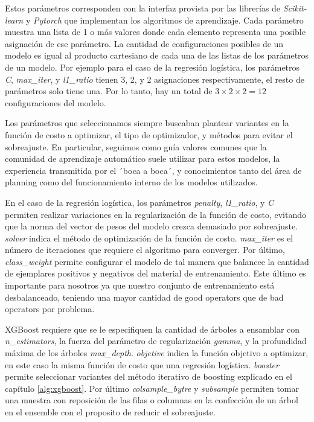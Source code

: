 Estos parámetros corresponden con la interfaz provista por las librerías de
\emph{Scikit-learn} y \emph{Pytorch} que implementan los algoritmos de aprendizaje. Cada parámetro muestra una lista de 1 o más valores donde cada elemento representa una posible asignación de ese parámetro. La cantidad de configuraciones posibles de un modelo es igual al producto cartesiano de cada una de las listas de los parámetros de un modelo. Por ejemplo para el caso de la regresión
logística, los parámetros \emph{C}, \emph{max\_iter}, y \emph{l1\_ratio} tienen 3, 2, y 2 asignaciones respectivamente, el resto de parámetros solo tiene una. Por lo tanto, hay un total de $3 \times 2 \times 2 = 12$ configuraciones del modelo.

Los parámetros que seleccionamos siempre buscaban plantear variantes en la función de costo a optimizar, el tipo de optimizador, y métodos para evitar el sobreajuste. En particular, seguimos como guía valores comunes que la comunidad de aprendizaje automático suele utilizar para estos modelos,  la experiencia transmitida por el ´boca a boca´, y conocimientos tanto del área de planning como del funcionamiento interno de los modelos utilizados. 

En el caso de la regresión logística, los parámetros \emph{penalty},
\emph{l1\_ratio}, y \emph{C} permiten realizar variaciones en la regularización
de la función de costo, evitando que la norma del vector de pesos del modelo
crezca demasiado por sobreajuste. \emph{solver} indica el método de optimización de la función de costo. \emph{max\_iter} es el número
de iteraciones que requiere el algoritmo para converger. Por último,
\emph{class\_weight} permite configurar el modelo de tal manera que balancee
la cantidad de ejemplares positivos y negativos del material de entrenamiento. Este último es importante para nosotros ya que nuestro conjunto de entrenamiento está desbalanceado, teniendo una mayor cantidad de good operators que de
bad operators por problema.

XGBoost requiere que se le especifiquen la cantidad de árboles a
ensamblar con \emph{n\_estimators}, la fuerza del parámetro de regularización
\emph{gamma}, y la profundidad máxima de los árboles \emph{max\_depth}. \emph{objetive} indica la función objetivo a optimizar, en este caso la misma función de costo que una regresión logística. \emph{booster} permite seleccionar variantes del método iterativo de boosting explicado en el capítulo \ref{alg:xgboost}. Por último \emph{colsample\_bytre} y \emph{subsample} permiten
tomar una muestra con reposición de las filas o columnas en la confección de un árbol en el ensemble con el proposito de reducir el sobreajuste.

